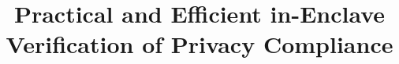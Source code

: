 \documentclass[conference]{IEEEtran}
\begin{document}
\title{Practical and Efficient in-Enclave Verification of Privacy Compliance}








\maketitle
\begingroup\renewcommand\thefootnote{\textsection}
\endgroup


















%


%
%
\end{document}
